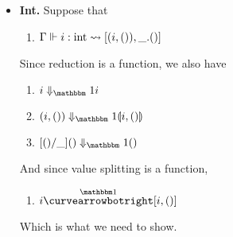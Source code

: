 \documentclass{article}
\begin{document}
\begin{itemize}
\item {\bf Int.} Suppose that
\begin{enumerate}
\item ${\Gamma} \Vdash {i}:{\rm int} \rightsquigarrow \left[{(i,()),\_.()}\right]$
\end{enumerate}
Since reduction is a function, we also have
\begin{enumerate}
\item $\reduceone{i}{i}$
\item $\reduceone{(i,())}{\valprod {i}{()}}$
\item $\reduceone{[()/\_]()}{()}$
\end{enumerate}
And since value splitting is a function,
\begin{enumerate}
\item $i \vsplito [i,()]$
\end{enumerate}
Which is what we need to show.


\end{itemize}
\end{document}
